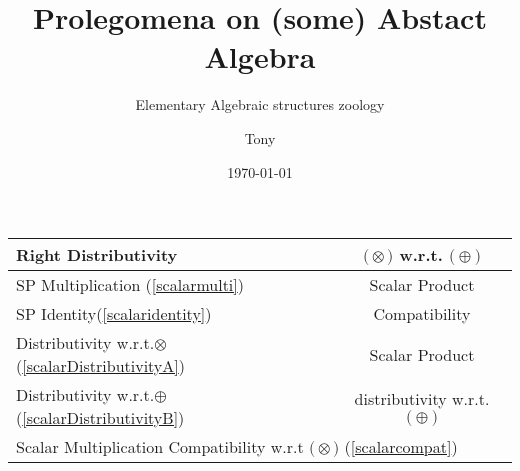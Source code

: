 \documentclass[a4paper,12pt]{scrartcl}    %
\newcommand{\OpA}{\otimes}
\newcommand{\OpB}{\oplus}
\begin{document}
\begin{landscape}
\begin{minipage}[t][]{0.60 \linewidth}
\begin{minipage}[c]{0,5\textwidth}
\begin{tabular}{|l|c|}
			    \cellcolor{blue!25} \footnotesize Right Distributivity & \tiny\cellcolor{yellow!25} $\big(\OpA\big)$ w.r.t. $\big(\OpB\big)$  \\
			   \hline
			  \hline
			     \cellcolor{blue!25} \footnotesize SP Multiplication (\ref{scalarmulti})&  \tiny\cellcolor{yellow!25}Scalar Product\\
			    \cellcolor{blue!25} \footnotesize SP Identity(\ref{scalaridentity}) & \tiny\cellcolor{yellow!25} Compatibility  \\
			   \hline 
			    \cellcolor{blue!25} \footnotesize Distributivity w.r.t.$\OpA$ (\ref{scalarDistributivityA})&  \tiny\cellcolor{yellow!25}Scalar Product\\
			    \cellcolor{blue!25} \footnotesize Distributivity w.r.t.$\OpB$ (\ref{scalarDistributivityB}) & \tiny\cellcolor{yellow!25} distributivity w.r.t. $\big(\OpB\big)$  \\
			   \hline
			    \multicolumn{2}{l}{\footnotesize \cellcolor{blue!25} Scalar Multiplication Compatibility w.r.t  $\big(\OpA\big)$ (\ref{scalarcompat})}\\
			   \hline
			\end{tabular}
			\vfill
		\end{minipage}
	\end{minipage}	


	\title{Prolegomena on (some) Abstact Algebra}
	\subtitle{Elementary Algebraic structures zoology}
	\author{Tony}
	\date{\today}
\maketitle

	\begin{minipage}[c][\textheight]{0.30 \linewidth}

\end{minipage}
\end{landscape}
\end{document}
